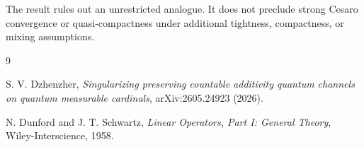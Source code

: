 \documentclass[11pt]{article}
\begin{document}
The result rules out an unrestricted analogue. It does not preclude strong
Cesaro convergence or quasi-compactness under additional tightness,
compactness, or mixing assumptions.

\begin{thebibliography}{9}

S. V. Dzhenzher,
\emph{Singularizing preserving countable additivity quantum channels on
quantum measurable cardinals}, arXiv:2605.24923 (2026).

N. Dunford and J. T. Schwartz,
\emph{Linear Operators, Part I: General Theory},
Wiley-Interscience, 1958.

\end{thebibliography}
\end{document}
